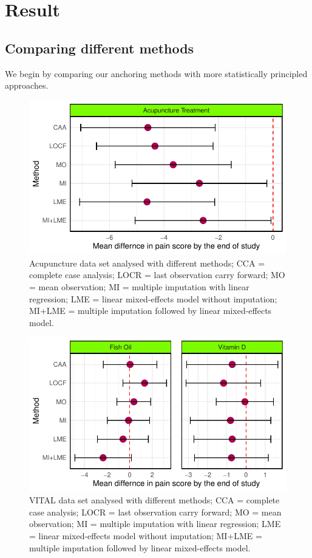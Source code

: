 \documentclass{article}
\newcommand{\pandocbounded}[1]{#1}
\begin{document}
\section{Result}\label{result}

\subsection{Comparing different
methods}\label{comparing-different-methods}

We begin by comparing our anchoring methods with more statistically
principled approaches.

\begin{figure}
\centering
\pandocbounded{\includegraphics[keepaspectratio]{Final_Report_files/figure-latex/unnamed-chunk-25-1.pdf}}
\caption{Acupuncture data set analysed with different methods; CCA =
complete case analysis; LOCR = last observation carry forward; MO = mean
observation; MI = multiple imputation with linear regression; LME =
linear mixed-effects model without imputation; MI+LME = multiple
imputation followed by linear mixed-effects model.}
\end{figure}

\begin{figure}
\centering
\pandocbounded{\includegraphics[keepaspectratio]{Final_Report_files/figure-latex/unnamed-chunk-26-1.pdf}}
\caption{VITAL data set analysed with different methods; CCA = complete
case analysis; LOCR = last observation carry forward; MO = mean
observation; MI = multiple imputation with linear regression; LME =
linear mixed-effects model without imputation; MI+LME = multiple
imputation followed by linear mixed-effects model.}
\end{figure}
\end{document}
